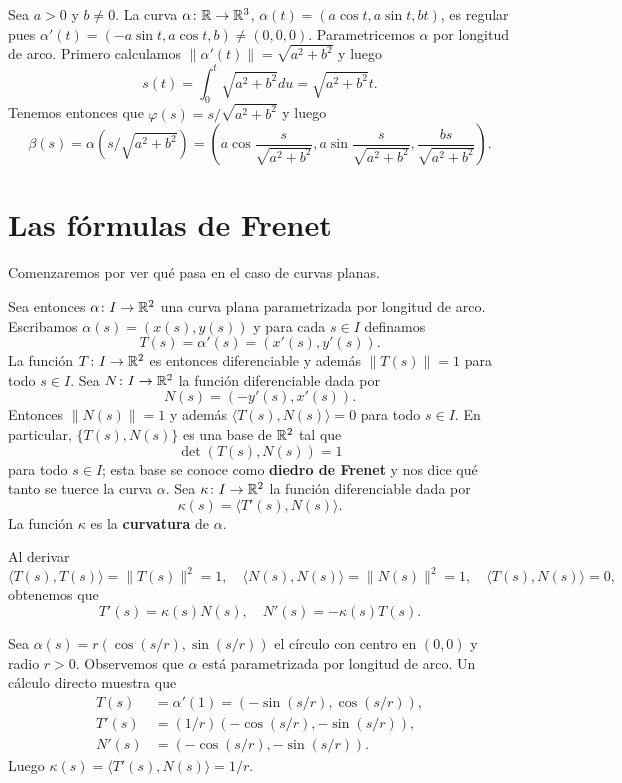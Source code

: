 \begin{example}
	Sea $a>0$ y $b\ne0$. La curva $\alpha\colon\mathbb{R}\to\mathbb{R}^3$, $\alpha(t)=(a\cos
	t,a\sin t,bt)$, es regular pues $\alpha'(t)=(-a\sin t,a\cos t,b)\ne
	(0,0,0)$. Parametricemos $\alpha$ por longitud de arco. Primero calculamos
	$\|\alpha'(t)\|=\sqrt{a^2+b^2}$ y luego 
	\[
		s(t)=\int_0^t \sqrt{a^2+b^2}du=\sqrt{a^2+b^2}t.
	\]
	Tenemos entonces que $\varphi(s)=s/\sqrt{a^2+b^2}$ y luego 
	\[
		\beta(s)=\alpha(s/\sqrt{a^2+b^2})
		=\left(a\cos\frac{s}{\sqrt{a^2+b^2}},a\sin\frac{s}{\sqrt{a^2+b^2}},\frac{bs}{\sqrt{a^2+b^2}}\right).
	\]
\end{example}

\chapter{Las fórmulas de Frenet}

Comenzaremos por ver qué pasa en el caso de curvas planas. 

Sea entonces
$\alpha\colon I\to\mathbb{R}^2$ una curva plana parametrizada por longitud de arco. Escribamos $\alpha(s)=(x(s),y(s))$ y 
para cada $s\in I$ definamos 
\[
	T(s)=\alpha'(s)=(x'(s),y'(s)).
\]
La función $T\colon I\to\mathbb{R}^2$ es entonces diferenciable y además $\|T(s)\|=1$
para todo $s\in I$. Sea $N\colon I\to\mathbb{R}^2$ la función diferenciable dada por 
\[
	N(s)=(-y'(s),x'(s)).
\]
Entonces $\|N(s)\|=1$ y además $\langle T(s),N(s)\rangle=0$ para todo $s\in I$.
En particular, $\{T(s),N(s)\}$ es una base de $\mathbb{R}^2$ tal que 
\[
	\det(T(s),N(s))=1
\]
para todo $s\in I$; esta base se conoce como \textbf{diedro de Frenet} y nos
dice qué tanto se tuerce la curva $\alpha$. Sea $\kappa\colon I\to\mathbb{R}^2$ la
función diferenciable dada por
\[
	\kappa(s)=\langle T'(s),N(s)\rangle.
\]
La función $\kappa$ es la \textbf{curvatura} de $\alpha$.

Al derivar 
\[
	\langle T(s),T(s)\rangle=\|T(s)\|^2=1,\quad
	\langle N(s),N(s)\rangle=\|N(s)\|^2=1,\quad
	\langle T(s),N(s)\rangle=0,
\]
obtenemos que
\[
	T'(s)=\kappa(s)N(s),\quad
	N'(s)=-\kappa(s)T(s).
\]

\begin{example}
	Sea $\alpha(s)=r(\cos(s/r),\sin(s/r))$ el círculo con centro en $(0,0)$ y
	radio $r>0$. Observemos que $\alpha$ está parametrizada por longitud de arco. 
	Un cálculo directo muestra que
	\begin{align*}
	T(s)&=\alpha'(1)=(-\sin(s/r),\cos(s/r)),\\
	T'(s)&=(1/r)(-\cos(s/r),-\sin(s/r)),\\
	N'(s)&=(-\cos(s/r),-\sin(s/r)).
	\end{align*}
	Luego $\kappa(s)=\langle T'(s),N(s)\rangle=1/r$. 
\end{example}

